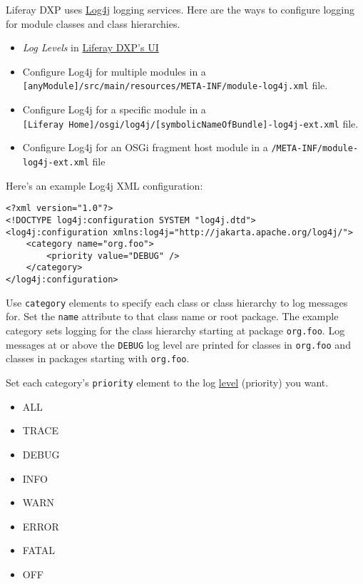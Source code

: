 Liferay DXP uses \href{http://logging.apache.org/log4j/1.2/}{Log4j}
logging services. Here are the ways to configure logging for module
classes and class hierarchies.

\begin{itemize}
\tightlist
\item
  \emph{Log Levels} in
  \href{/docs/7-2/user/-/knowledge_base/u/server-administration}{Liferay
  DXP's UI}
\item
  Configure Log4j for multiple modules in a
  \texttt{{[}anyModule{]}/src/main/resources/META-INF/module-log4j.xml}
  file.
\item
  Configure Log4j for a specific module in a
  \texttt{{[}Liferay\ Home{]}/osgi/log4j/{[}symbolicNameOfBundle{]}-log4j-ext.xml}
  file.
\item
  Configure Log4j for an OSGi fragment host module in a
  \texttt{/META-INF/module-log4j-ext.xml} file
\end{itemize}

Here's an example Log4j XML configuration:

\begin{verbatim}
<?xml version="1.0"?>
<!DOCTYPE log4j:configuration SYSTEM "log4j.dtd">
<log4j:configuration xmlns:log4j="http://jakarta.apache.org/log4j/">
    <category name="org.foo">
        <priority value="DEBUG" />
    </category>
</log4j:configuration>
\end{verbatim}

Use \texttt{category} elements to specify each class or class hierarchy
to log messages for. Set the \texttt{name} attribute to that class name
or root package. The example category sets logging for the class
hierarchy starting at package \texttt{org.foo}. Log messages at or above
the \texttt{DEBUG} log level are printed for classes in \texttt{org.foo}
and classes in packages starting with \texttt{org.foo}.

Set each category's \texttt{priority} element to the log
\href{http://logging.apache.org/log4j/1.2/apidocs/org/apache/log4j/Level.html}{level}
(priority) you want.

\begin{itemize}
\tightlist
\item
  ALL
\item
  TRACE
\item
  DEBUG
\item
  INFO
\item
  WARN
\item
  ERROR
\item
  FATAL
\item
  OFF
\end{itemize}

